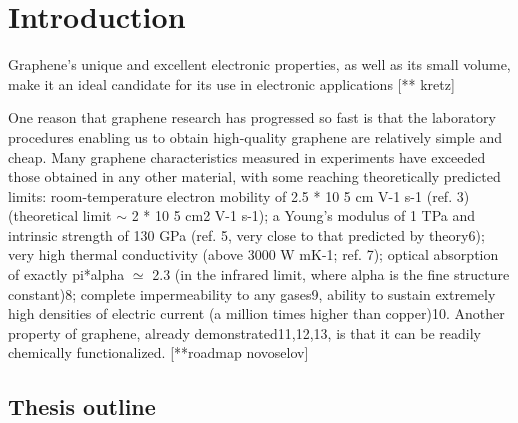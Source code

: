 
\chapter{Introduction}

\label{ch1}


\newcommand{\keyword}[1]{\textbf{#1}}
\newcommand{\tabhead}[1]{\textbf{#1}}
\newcommand{\code}[1]{\texttt{#1}}
\newcommand{\file}[1]{\texttt{\bfseries#1}}
\newcommand{\option}[1]{\texttt{\itshape#1}}


Graphene’s unique and excellent electronic properties, as well as its small volume,
make it an ideal candidate for its use in electronic applications [** kretz]

One reason that graphene research has progressed so fast is that the laboratory procedures enabling us to obtain high-quality graphene are relatively simple and cheap. Many graphene characteristics measured in experiments have exceeded those obtained in any other material, with some reaching theoretically predicted limits: room-temperature electron mobility of 2.5 * 10 5 cm V-1 s-1 (ref. 3) (theoretical limit $\sim$ 2 * 10 5 cm2 V-1 s-1); a Young's modulus of 1 TPa and intrinsic strength of 130 GPa (ref. 5, very close to that predicted by theory6); very high thermal conductivity (above 3000 W mK-1; ref. 7); optical absorption of exactly pi*alpha $\simeq$ 2.3 (in the infrared limit, where alpha is the fine structure constant)8; complete impermeability to any gases9, ability to sustain extremely high densities of electric current (a million times higher than copper)10. Another property of graphene, already demonstrated11,12,13, is that it can be readily chemically functionalized. [**roadmap novoselov]

\section{Thesis outline}




